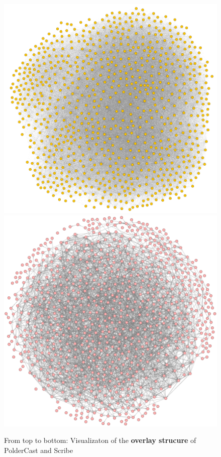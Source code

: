 \afterpage{\clearpage}
\begin{figure}
    \vspace{-100pt}
    \includegraphics[scale=0.45]{figures/polder_struct}
    \includegraphics[scale=0.45]{figures/scribe_struct}
    \caption{From top to bottom: Visualizaton of the \textbf{overlay
            strucure} of PolderCast and Scribe}
    \label{fig:struct}
\end{figure}

